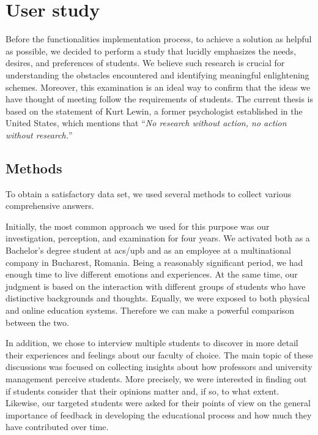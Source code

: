 \chapter{User study} \label{chapter3}

    Before the functionalities implementation process, to achieve a solution as helpful as possible, we decided to perform a study that lucidly emphasizes the needs, desires, and preferences of students. We believe such research is crucial for understanding the obstacles encountered and identifying meaningful enlightening schemes. Moreover, this examination is an ideal way to confirm that the ideas we have thought of meeting follow the requirements of students. The current thesis is based on the statement of Kurt Lewin, a former psychologist established in the United States, which mentions that “\textit{No research without action, no action without research.}”

\section{Methods} \label{3:methods}

    To obtain a satisfactory data set, we used several methods to collect various comprehensive answers.
    
    Initially, the most common approach we used for this purpose was our investigation, perception, and examination for four years. We activated both as a Bachelor's degree student at \acrshort{acs}/\acrshort{upb} and as an employee at a multinational company in Bucharest, Romania. Being a reasonably significant period, we had enough time to live different emotions and experiences. At the same time, our judgment is based on the interaction with different groups of students who have distinctive backgrounds and thoughts. Equally, we were exposed to both physical and online education systems. Therefore we can make a powerful comparison between the two.
    
    In addition, we chose to interview multiple students to discover in more detail their experiences and feelings about our faculty of choice. The main topic of these discussions was focused on collecting insights about how professors and university management perceive students. More precisely, we were interested in finding out if students consider that their opinions matter and, if so, to what extent. Likewise, our targeted students were asked for their points of view on the general importance of feedback in developing the educational process and how much they have contributed over time.
    
